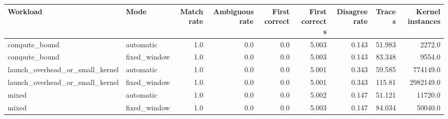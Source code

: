 \begin{tabular}{llrrrrrrr}
\hline
Workload & Mode & Match rate & Ambiguous rate & First correct & First correct s & Disagree rate & Trace s & Kernel instances \\
\hline
compute_bound & automatic & 1.0 & 0.0 & 0.0 & 5.003 & 0.143 & 51.983 & 2272.0 \\
compute_bound & fixed_window & 1.0 & 0.0 & 0.0 & 5.003 & 0.143 & 83.348 & 9554.0 \\
launch_overhead_or_small_kernel & automatic & 1.0 & 0.0 & 0.0 & 5.001 & 0.343 & 59.585 & 774149.0 \\
launch_overhead_or_small_kernel & fixed_window & 1.0 & 0.0 & 0.0 & 5.001 & 0.343 & 115.81 & 2982149.0 \\
mixed & automatic & 1.0 & 0.0 & 0.0 & 5.002 & 0.147 & 51.121 & 11720.0 \\
mixed & fixed_window & 1.0 & 0.0 & 0.0 & 5.003 & 0.147 & 84.034 & 50040.0 \\
\hline
\end{tabular}
